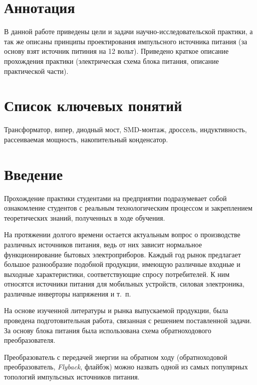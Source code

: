 




\setcounter{page}{3}

\section*{Аннотация}

	В данной работе приведены цели и задачи научно-исследовательской практики, а так же описаны принципы проектирования импульсного источника питания (за основу взят источник питиния на 12 вольт). Приведено краткое описание прохождения практики (электрическая схема блока питания, описание практической части).

\section*{Список ключевых понятий}

	Трансформатор, випер, диодный мост, SMD-монтаж, дроссель, индуктивность, рассеиваемая мощность, накопительный конденсатор.

\newpage

\tableofcontents
\newpage

\section{Введение}
	Прохождение практики студентами на предприятии подразумевает собой ознакомление студентов с реальным технологическим процессом и закреплением теоретических знаний, полученных в ходе обучения.
	
	На протяжении долгого времени остается актуальным вопрос о производстве различных источников питания, ведь от них зависит нормальное функционирование бытовых электроприборов. Каждый год рынок предлагает большое разнообразие подобной продукции, имеющую различные входные и выходные характеристики, соответствующие спросу потребителей. К ним относятся источники питания для мобильных устройств, силовая электроника, различные инверторы напряжения и т.~п.
	
	На основе изученной литературы и рынка выпускаемой продукции, была проведена подготовительная работа, связанная с решением поставленной задачи. За основу блока питания была использована схема обратноходового преобразователя.
	
Преобразователь с передачей энергии на обратном ходу (обратноходовой преобразователь, \emph{Flyback}, флайбэк) можно назвать одной из самых популярных топологий импульсных источников питания.


